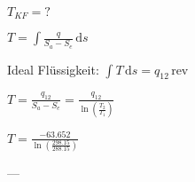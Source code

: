 \( T_{KF} = ? \)  

\( T = \int \frac{q}{S_a - S_e} \, \text{d}s \)  

Ideal Flüssigkeit:  
\( \int T \, \text{d}s = q_{12} \, \text{rev} \)  

\( T = \frac{q_{12}}{S_a - S_e} = \frac{q_{12}}{\ln \left( \frac{T_2}{T_1} \right)} \)  

\( T = \frac{-63.652}{\ln \left( \frac{298.15}{288.15} \right)} \)  

---